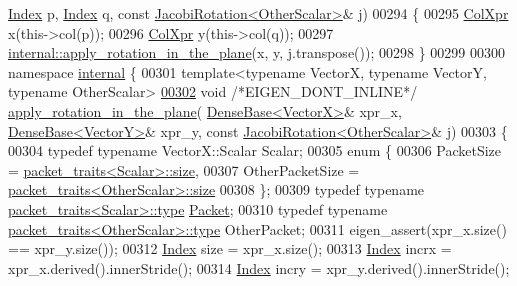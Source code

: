 \begin{DoxyCode}
      \hyperlink{namespace_eigen_a62e77e0933482dafde8fe197d9a2cfde}{Index} p, \hyperlink{namespace_eigen_a62e77e0933482dafde8fe197d9a2cfde}{Index} q, \textcolor{keyword}{const} \hyperlink{group___jacobi___module_class_eigen_1_1_jacobi_rotation}{JacobiRotation<OtherScalar>}& j)
00294 \{
00295   \hyperlink{group___core___module_class_eigen_1_1_block}{ColXpr} x(this->col(p));
00296   \hyperlink{group___core___module_class_eigen_1_1_block}{ColXpr} y(this->col(q));
00297   \hyperlink{namespace_eigen_1_1internal_a5f7738a5c56c9b9decf94d9728ba7906}{internal::apply\_rotation\_in\_the\_plane}(x, y, j.transpose());
00298 \}
00299 
00300 \textcolor{keyword}{namespace }\hyperlink{namespaceinternal}{internal} \{
00301 \textcolor{keyword}{template}<\textcolor{keyword}{typename} VectorX, \textcolor{keyword}{typename} VectorY, \textcolor{keyword}{typename} OtherScalar>
\hyperlink{namespace_eigen_1_1internal_a5f7738a5c56c9b9decf94d9728ba7906}{00302} \textcolor{keywordtype}{void} \textcolor{comment}{/*EIGEN\_DONT\_INLINE*/} \hyperlink{namespace_eigen_1_1internal_a5f7738a5c56c9b9decf94d9728ba7906}{apply\_rotation\_in\_the\_plane}(
      \hyperlink{group___core___module_class_eigen_1_1_dense_base}{DenseBase<VectorX>}& xpr\_x, \hyperlink{group___core___module_class_eigen_1_1_dense_base}{DenseBase<VectorY>}& xpr\_y, \textcolor{keyword}{const} 
      \hyperlink{group___jacobi___module_class_eigen_1_1_jacobi_rotation}{JacobiRotation<OtherScalar>}& j)
00303 \{
00304   \textcolor{keyword}{typedef} \textcolor{keyword}{typename} VectorX::Scalar Scalar;
00305   \textcolor{keyword}{enum} \{
00306     PacketSize = \hyperlink{struct_eigen_1_1internal_1_1packet__traits}{packet\_traits<Scalar>::size},
00307     OtherPacketSize = \hyperlink{struct_eigen_1_1internal_1_1packet__traits}{packet\_traits<OtherScalar>::size}
00308   \};
00309   \textcolor{keyword}{typedef} \textcolor{keyword}{typename} \hyperlink{struct_eigen_1_1internal_1_1packet__traits}{packet\_traits<Scalar>::type} \hyperlink{union_eigen_1_1internal_1_1_packet}{Packet};
00310   \textcolor{keyword}{typedef} \textcolor{keyword}{typename} \hyperlink{group___sparse_core___module}{packet\_traits<OtherScalar>::type} OtherPacket;
00311   eigen\_assert(xpr\_x.size() == xpr\_y.size());
00312   \hyperlink{namespace_eigen_a62e77e0933482dafde8fe197d9a2cfde}{Index} size = xpr\_x.size();
00313   \hyperlink{namespace_eigen_a62e77e0933482dafde8fe197d9a2cfde}{Index} incrx = xpr\_x.derived().innerStride();
00314   \hyperlink{namespace_eigen_a62e77e0933482dafde8fe197d9a2cfde}{Index} incry = xpr\_y.derived().innerStride();

\end{DoxyCode}
